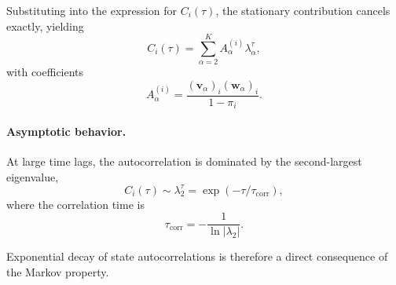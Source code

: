 \documentclass[11pt]{article}
\begin{document}
Substituting into the expression for $C_i(\tau)$, the stationary contribution
cancels exactly, yielding
\begin{equation}
    C_i(\tau)
    =
    \sum_{\alpha=2}^K
    A_\alpha^{(i)} \lambda_\alpha^\tau,
\end{equation}
with coefficients
\begin{equation}
    A_\alpha^{(i)}
    =
    \frac{
        (\mathbf{v}_\alpha)_i (\mathbf{w}_\alpha)_i
    }{
        1-\pi_i
    }.
\end{equation}

\paragraph{Asymptotic behavior.}
At large time lags, the autocorrelation is dominated by the second-largest
eigenvalue,
\begin{equation}
    C_i(\tau) \sim \lambda_2^\tau
    =
    \exp\!\left(-\tau / \tau_{\mathrm{corr}}\right),
\end{equation}
where the correlation time is
\begin{equation}
    \tau_{\mathrm{corr}} = -\frac{1}{\ln|\lambda_2|}.
\end{equation}

Exponential decay of state autocorrelations is therefore a direct consequence
of the Markov property.
\end{document}

